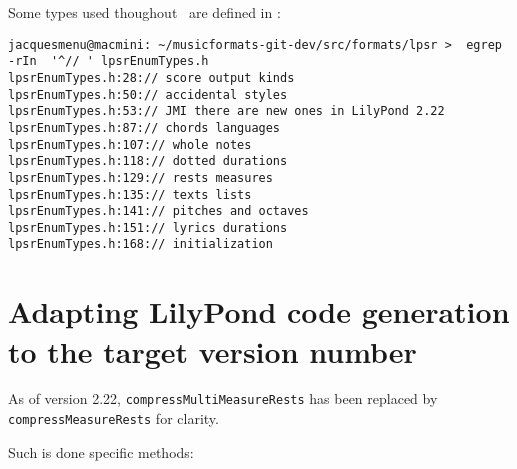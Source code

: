 Some types used thoughout \lpsrRepr\ are defined in :%
\begin{lstlisting}[language=Terminal]
jacquesmenu@macmini: ~/musicformats-git-dev/src/formats/lpsr >  egrep -rIn  '^// ' lpsrEnumTypes.h
lpsrEnumTypes.h:28:// score output kinds
lpsrEnumTypes.h:50:// accidental styles
lpsrEnumTypes.h:53:// JMI there are new ones in LilyPond 2.22
lpsrEnumTypes.h:87:// chords languages
lpsrEnumTypes.h:107:// whole notes
lpsrEnumTypes.h:118:// dotted durations
lpsrEnumTypes.h:129:// rests measures
lpsrEnumTypes.h:135:// texts lists
lpsrEnumTypes.h:141:// pitches and octaves
lpsrEnumTypes.h:151:// lyrics durations
lpsrEnumTypes.h:168:// initialization
\end{lstlisting}


\section{Adapting LilyPond code generation to the target version number}

As of version 2.22, {\tt compressMultiMeasureRests} has been replaced by {\tt compressMeasureRests} for clarity.

Such is done specific methods:
\begin{lstlisting}[language=CPlusPlus]

\end{lstlisting}
